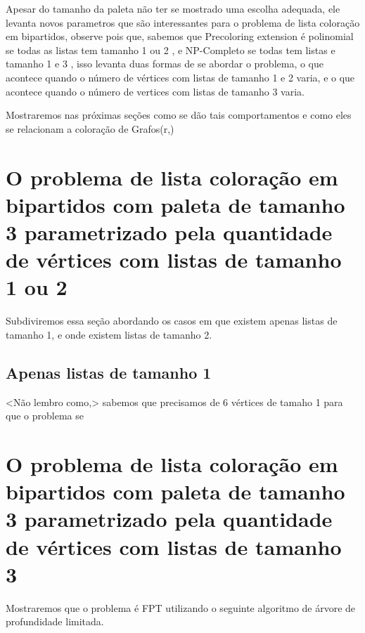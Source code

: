 Apesar do tamanho da paleta não ter se mostrado uma escolha adequada, ele levanta novos parametros que são interessantes para o problema de lista coloração em bipartidos, observe pois que, sabemos que Precoloring extension é polinomial se todas as listas tem tamanho 1 ou 2 \cite{HUJTER93}, e NP-Completo se todas tem listas e tamanho 1 e 3 \cite{Kratochvil94}, isso levanta duas formas de se abordar o problema, o que acontece quando o número de vértices com listas de tamanho 1 e 2 varia, e o que acontece quando o número de vertices com listas de tamanho 3 varia.

Mostraremos nas próximas seções como se dão tais comportamentos e como eles se relacionam a coloração de Grafos(r,\ell)
\section{O problema de lista coloração em bipartidos com paleta de tamanho 3 parametrizado pela quantidade de vértices com listas de tamanho 1 ou 2}
Subdiviremos essa seção abordando os casos em que existem apenas listas de tamanho 1, e onde existem listas de tamanho 2.
\subsection{Apenas listas de tamanho 1}
 <Não lembro como,> sabemos que precisamos de 6 vértices de tamaho 1 para que o problema se 
\section{O problema de lista coloração em bipartidos com paleta de tamanho 3 parametrizado pela quantidade de vértices com listas de tamanho 3}
Mostraremos que o problema é FPT utilizando o seguinte algoritmo de árvore de profundidade limitada.
